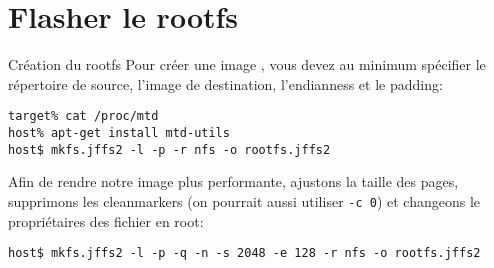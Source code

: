 

\section{Flasher le rootfs}

\begin{frame}[fragile=singleslide]{Création du rootfs}
  Pour créer une image , vous devez au minimum spécifier le
  répertoire  de source,  l'image de  destination, l'endianness  et le
  padding:
  \begin{lstlisting} 
target% cat /proc/mtd
host% apt-get install mtd-utils
host$ mkfs.jffs2 -l -p -r nfs -o rootfs.jffs2
  \end{lstlisting}
  Afin de rendre notre image  plus performante, ajustons la taille des
  pages,  supprimons  les  cleanmarkers  (on pourrait  aussi  utiliser
  \verb+-c 0+) et changeons le propriétaires des fichier en root:
  \begin{lstlisting} 
host$ mkfs.jffs2 -l -p -q -n -s 2048 -e 128 -r nfs -o rootfs.jffs2
  \end{lstlisting}
\end{frame}

